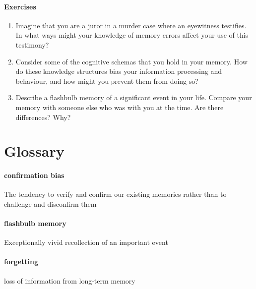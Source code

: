 \documentclass[
]{krantz}
\providecommand{\tightlist}{%
  \setlength{\itemsep}{0pt}\setlength{\parskip}{0pt}}
\begin{document}
\paragraph*{Exercises}\label{exercises-5}

\begin{enumerate}
\def\labelenumi{\arabic{enumi}.}
\tightlist
\item
  Imagine that you are a juror in a murder case where an eyewitness testifies. In what ways might your knowledge of memory errors affect your use of this testimony?
\item
  Consider some of the cognitive schemas that you hold in your memory. How do these knowledge structures bias your information processing and behaviour, and how might you prevent them from doing so?
\item
  Describe a flashbulb memory of a significant event in your life. Compare your memory with someone else who was with you at the time. Are there differences? Why?
\end{enumerate}

\section{Glossary}\label{glossary-5}

\paragraph*{confirmation bias}\label{confirmation-bias}

The tendency to verify and confirm our existing memories rather than to challenge and disconfirm them

\paragraph*{flashbulb memory}\label{flashbulb-memory}

Exceptionally vivid recollection of an important event

\paragraph*{forgetting}\label{forgetting-1}

loss of information from long-term memory
\end{document}

